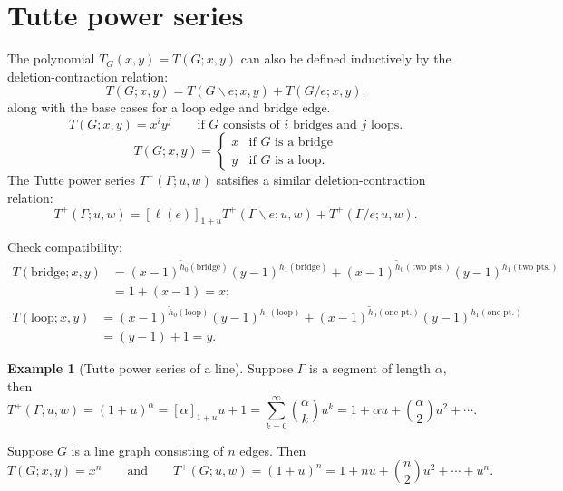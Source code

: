 \documentclass{amsart}
\theoremstyle{definition}
\newtheorem{eg}[thm]{Example}
\begin{document}
\cite{ACP}


\section{Tutte power series}
The polynomial $T_G(x,y) = T(G; x,y)$ can also be defined inductively by the 
deletion-contraction relation:
\begin{equation*}
T(G;x,y) = T(G \backslash e; x,y) + T(G / e; x,y).
\end{equation*}
along with the base cases for a loop edge and bridge edge.
\begin{equation*}
T(G; x,y) = x^i y^j \qquad\text{if $G$ consists of $i$ bridges and $j$ loops.}
\end{equation*}
\begin{equation*}
T(G;x,y) = \begin{cases}
x & \text{if $G$ is a bridge} \\
y & \text{if $G$ is a loop}.
\end{cases}
\end{equation*}
The Tutte power series $T^+(\Gamma; u,w)$ satsifies a similar deletion-contraction relation:
\begin{equation}
T^+(\Gamma; u,w) = [\ell(e)]_{1+u} T^+(\Gamma \backslash e; u,w) + T^+(\Gamma / e; u,w) .
\end{equation}

Check compatibility:
\begin{align*}
T(\text{bridge}; x,y) 
&= (x-1)^{\tilde h_0(\text{bridge}) }(y-1)^{h_1(\text{bridge} )} 
+ (x-1)^{\tilde h_0(\text{two pts.}) }(y-1)^{h_1(\text{two pts.})}  \\
&= 1 + (x-1) = x ;
\end{align*}
\begin{align*}
T(\text{loop}; x,y) 
&= (x-1)^{\tilde h_0(\text{loop}) }(y-1)^{h_1(\text{loop} )} 
+ (x-1)^{\tilde h_0(\text{one pt.}) }(y-1)^{h_1(\text{one pt.})} \\
&= (y-1) + 1 = y .
\end{align*}

\begin{eg}[Tutte power series of a line]
Suppose $\Gamma$ is a segment of length $\alpha$,
then
$$
T^+(\Gamma;u,w) = (1+u)^\alpha
= [\alpha]_{1+u} u + 1 = \sum_{k=0}^\infty \binom{\alpha}{k} u^k
= 1 + \alpha u + \binom{\alpha}{2}u^2 + \cdots .
$$

Suppose $G$ is a line graph consisting of $n$ edges.
Then
$$
T(G;x,y) = x^n 
\qquad\text{and}\qquad 
T^+(G;u,w) = (1+u)^n = 1 + nu + \binom{n}{2}u^2 + \cdots + u^n.
$$
\end{eg}
\end{document}
